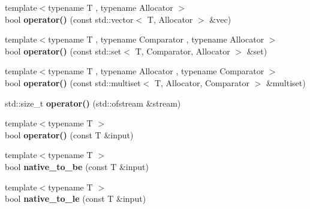 \begin{DoxyCompactItemize}
\item 
\hypertarget{classstrtk_1_1binary_1_1writer_a8f310903c97213fb229014fcdfd2b3bf}{{\footnotesize template$<$typename T , typename Allocator $>$ }\\bool {\bfseries operator()} (const std\-::vector$<$ T, Allocator $>$ \&vec)}\label{classstrtk_1_1binary_1_1writer_a8f310903c97213fb229014fcdfd2b3bf}

\item 
\hypertarget{classstrtk_1_1binary_1_1writer_abd48284dcf0e79bba8289df50f091a83}{{\footnotesize template$<$typename T , typename Comparator , typename Allocator $>$ }\\bool {\bfseries operator()} (const std\-::set$<$ T, Comparator, Allocator $>$ \&set)}\label{classstrtk_1_1binary_1_1writer_abd48284dcf0e79bba8289df50f091a83}

\item 
\hypertarget{classstrtk_1_1binary_1_1writer_a44cf8772918463b7e10d116c2e86726d}{{\footnotesize template$<$typename T , typename Allocator , typename Comparator $>$ }\\bool {\bfseries operator()} (const std\-::multiset$<$ T, Allocator, Comparator $>$ \&multiset)}\label{classstrtk_1_1binary_1_1writer_a44cf8772918463b7e10d116c2e86726d}

\item 
\hypertarget{classstrtk_1_1binary_1_1writer_a75fc3f5e25a291c045fc2ba479a75ae7}{std\-::size\-\_\-t {\bfseries operator()} (std\-::ofstream \&stream)}\label{classstrtk_1_1binary_1_1writer_a75fc3f5e25a291c045fc2ba479a75ae7}

\item 
\hypertarget{classstrtk_1_1binary_1_1writer_a1c7dbf357d387c9b40b99dacf39da406}{{\footnotesize template$<$typename T $>$ }\\bool {\bfseries operator()} (const T \&input)}\label{classstrtk_1_1binary_1_1writer_a1c7dbf357d387c9b40b99dacf39da406}

\item 
\hypertarget{classstrtk_1_1binary_1_1writer_aa99deec9805faa41d854410bc629b540}{{\footnotesize template$<$typename T $>$ }\\bool {\bfseries native\-\_\-to\-\_\-be} (const T \&input)}\label{classstrtk_1_1binary_1_1writer_aa99deec9805faa41d854410bc629b540}

\item 
\hypertarget{classstrtk_1_1binary_1_1writer_ab40362fbb9555b4e5bdea77e7cba7c04}{{\footnotesize template$<$typename T $>$ }\\bool {\bfseries native\-\_\-to\-\_\-le} (const T \&input)}\label{classstrtk_1_1binary_1_1writer_ab40362fbb9555b4e5bdea77e7cba7c04}


\end{DoxyCompactItemize}
